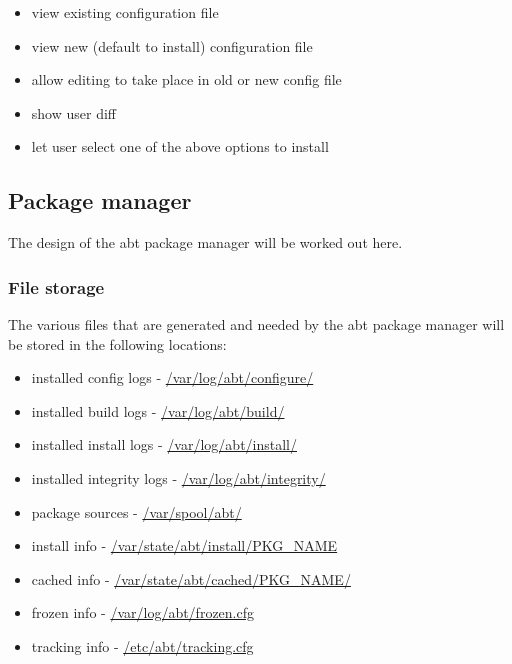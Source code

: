 \begin{itemize}
  \item view existing configuration file
  \item view new (default to install) configuration file
  \item allow editing to take place in old or new config file
  \item show user diff
  \item let user select one of the above options to install
\end{itemize}


\subsection{Package manager}
The design of the abt package manager will be worked out here.

\subsubsection{File storage}
The various files that are generated and needed by the abt package manager will be stored in the following locations:

\begin{itemize}
  \item installed config logs - \url{/var/log/abt/configure/}
  \item installed build logs - \url{/var/log/abt/build/}
  \item installed install logs - \url{/var/log/abt/install/}
  \item installed integrity logs - \url{/var/log/abt/integrity/}
  \item package sources - \url{/var/spool/abt/}
  \item install info - \url{/var/state/abt/install/PKG_NAME}
  \item cached info - \url{/var/state/abt/cached/PKG_NAME/}
  \item frozen info - \url{/var/log/abt/frozen.cfg}
  \item tracking info - \url{/etc/abt/tracking.cfg}
\end{itemize}
